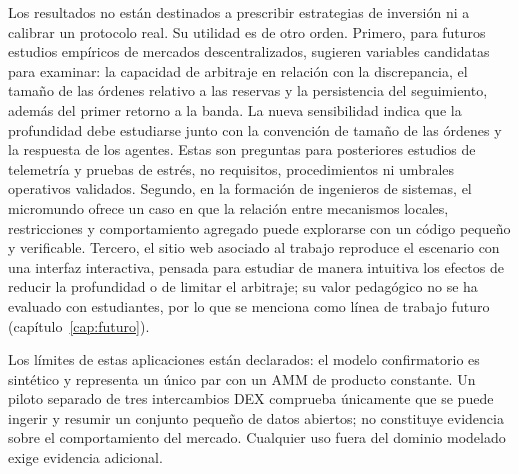 Los resultados no están destinados a prescribir estrategias de inversión ni a calibrar un protocolo real. Su utilidad es de otro orden. Primero, para futuros estudios empíricos de mercados descentralizados, sugieren variables candidatas para examinar: la capacidad de arbitraje en relación con la discrepancia, el tamaño de las órdenes relativo a las reservas y la persistencia del seguimiento, además del primer retorno a la banda. La nueva sensibilidad indica que la profundidad debe estudiarse junto con la convención de tamaño de las órdenes y la respuesta de los agentes. Estas son preguntas para posteriores estudios de telemetría y pruebas de estrés, no requisitos, procedimientos ni umbrales operativos validados. Segundo, en la formación de ingenieros de sistemas, el micromundo ofrece un caso en que la relación entre mecanismos locales, restricciones y comportamiento agregado puede explorarse con un código pequeño y verificable. Tercero, el sitio web asociado al trabajo reproduce el escenario con una interfaz interactiva, pensada para estudiar de manera intuitiva los efectos de reducir la profundidad o de limitar el arbitraje; su valor pedagógico no se ha evaluado con estudiantes, por lo que se menciona como línea de trabajo futuro (capítulo~\ref{cap:futuro}).

Los límites de estas aplicaciones están declarados: el modelo confirmatorio es sintético y representa un único par con un AMM de producto constante. Un piloto separado de tres intercambios DEX comprueba únicamente que se puede ingerir y resumir un conjunto pequeño de datos abiertos; no constituye evidencia sobre el comportamiento del mercado. Cualquier uso fuera del dominio modelado exige evidencia adicional.
